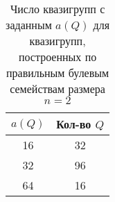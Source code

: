     \begin{table}[h]
        \centering
        \captionsetup{justification=centering} %
        \caption{\label{tab:associdx2} Число квазигрупп с заданным $a(Q)$ для квазигрупп, построенных по правильным булевым семействам размера $n=2$}
        \begin{tabular}{|c|c|}
            \toprule
            $a(Q)$ & Кол-во $Q$ \\
            \midrule
            16 & 32 \\
            \midrule
            32 & 96 \\
            \midrule
            64 & 16 \\
            \bottomrule
        \end{tabular}
    \end{table}

